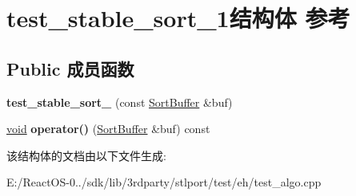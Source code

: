 \hypertarget{structtest__stable__sort__1}{}\section{test\+\_\+stable\+\_\+sort\+\_\+1结构体 参考}
\label{structtest__stable__sort__1}
\subsection*{Public 成员函数}
\begin{DoxyCompactItemize}
\item 
\mbox{\label{structtest__stable__sort__1_ae6d96b5b0b1ec534fd6392c3dc9053ce}} 
{\bfseries test\+\_\+stable\+\_\+sort\+\_} (const \hyperlink{struct_sort_buffer}{Sort\+Buffer} \&buf)
\item 
\mbox{\label{structtest__stable__sort__1_a7ffbf33ae0ea80132608f3833d292dd2}} 
\hyperlink{interfacevoid}{void} {\bfseries operator()} (\hyperlink{struct_sort_buffer}{Sort\+Buffer} \&buf) const
\end{DoxyCompactItemize}


该结构体的文档由以下文件生成\+:\begin{DoxyCompactItemize}
\item 
E\+:/\+React\+O\+S-\/0../sdk/lib/3rdparty/stlport/test/eh/test\+\_\+algo.\+cpp\end{DoxyCompactItemize}
